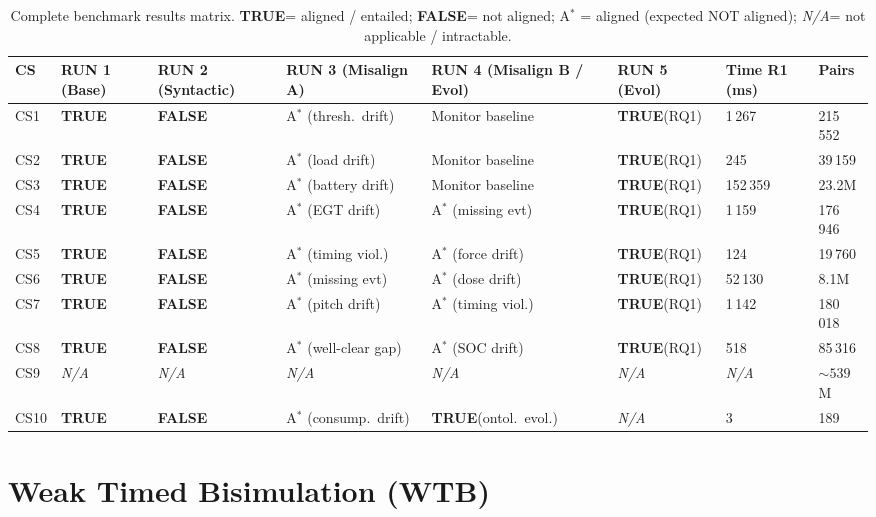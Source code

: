 \documentclass[10pt,a4paper]{article}
\newcommand{\OK}{\textcolor{okgreen}{\textbf{TRUE}}}
\newcommand{\FAIL}{\textcolor{warnred}{\textbf{FALSE}}}
\newcommand{\NA}{\textcolor{notegray}{\textit{N/A}}}
\newcommand{\WARN}[1]{\textcolor{warnred}{#1}}
\begin{document}
\begin{table}
\centering
\caption{Complete benchmark results matrix.
         \OK = aligned / entailed; \FAIL = not aligned;
         \WARN{A${}^*$} = aligned (expected NOT aligned);
         \NA = not applicable / intractable.}
\label{tab:complete}
\small
\begin{tabular}{@{}llllllll@{}}
\toprule
\textbf{CS} & \textbf{RUN 1 (Base)} & \textbf{RUN 2 (Syntactic)}
            & \textbf{RUN 3 (Misalign A)} & \textbf{RUN 4 (Misalign B / Evol)}
            & \textbf{RUN 5 (Evol)} & \textbf{Time R1 (ms)} & \textbf{Pairs} \\
\midrule
CS1  & \OK & \FAIL & \WARN{A${}^*$} (thresh.\ drift)   & Monitor baseline  & \OK (RQ1)  &   1\,267 & 215\,552 \\
CS2  & \OK & \FAIL & \WARN{A${}^*$} (load drift)        & Monitor baseline  & \OK (RQ1)  &     245  &  39\,159 \\
CS3  & \OK & \FAIL & \WARN{A${}^*$} (battery drift)     & Monitor baseline  & \OK (RQ1)  & 152\,359 & 23.2M \\
CS4  & \OK & \FAIL & \WARN{A${}^*$} (EGT drift)         & \WARN{A${}^*$} (missing evt) & \OK (RQ1) & 1\,159 & 176\,946 \\
CS5  & \OK & \FAIL & \WARN{A${}^*$} (timing viol.)      & \WARN{A${}^*$} (force drift) & \OK (RQ1) &    124 &  19\,760 \\
CS6  & \OK & \FAIL & \WARN{A${}^*$} (missing evt)       & \WARN{A${}^*$} (dose drift)  & \OK (RQ1) & 52\,130 &  8.1M \\
CS7  & \OK & \FAIL & \WARN{A${}^*$} (pitch drift)       & \WARN{A${}^*$} (timing viol.) & \OK (RQ1) & 1\,142 & 180\,018 \\
CS8  & \OK & \FAIL & \WARN{A${}^*$} (well-clear gap)    & \WARN{A${}^*$} (SOC drift)   & \OK (RQ1) &    518 &  85\,316 \\
CS9  & \NA & \NA   & \NA                                & \NA               & \NA        &   \NA    & ${\sim}539$M \\
CS10 & \OK & \FAIL & \WARN{A${}^*$} (consump.\ drift)   & \OK (ontol.\ evol.) & \NA      &       3  &      189 \\
\bottomrule
\end{tabular}
\end{table}

\section{Weak Timed Bisimulation (\textsc{WTB})}
\end{document}
